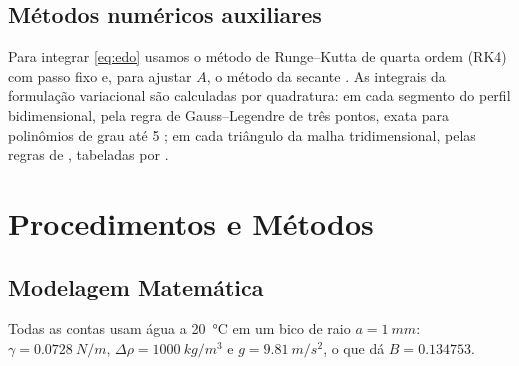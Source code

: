 \documentclass[12pt, oneside, a4paper, english, brazil]{abntex2}
\theoremstyle{relatorio}
\theoremstyle{relatorioit}
\theoremstyle{problema}
\begin{document}
\section{Métodos numéricos auxiliares}

Para integrar \eqref{eq:edo} usamos o método de Runge--Kutta de quarta ordem (RK4) com
passo fixo e, para ajustar $A$, o método da secante \parencite{burden2008}. As
integrais da formulação variacional são calculadas por quadratura: em cada segmento
do perfil bidimensional, pela regra de Gauss--Legendre de três pontos, exata para
polinômios de grau até 5 \parencite{burden2008}; em cada triângulo da malha
tridimensional, pelas regras de \textcite{strang1973}, tabeladas por
\textcite{burkardt}.

\chapter{Procedimentos e Métodos}

\section{Modelagem Matemática}

Todas as contas usam água a \qty{20}{\celsius} em um bico de raio
$a = \qty{1}{mm}$: $\gamma = \qty{0.0728}{N/m}$, $\Delta\rho = \qty{1000}{kg/m^3}$ e
$g = \qty{9.81}{m/s^2}$, o que dá $B = \num{0.134753}$.
\end{document}
